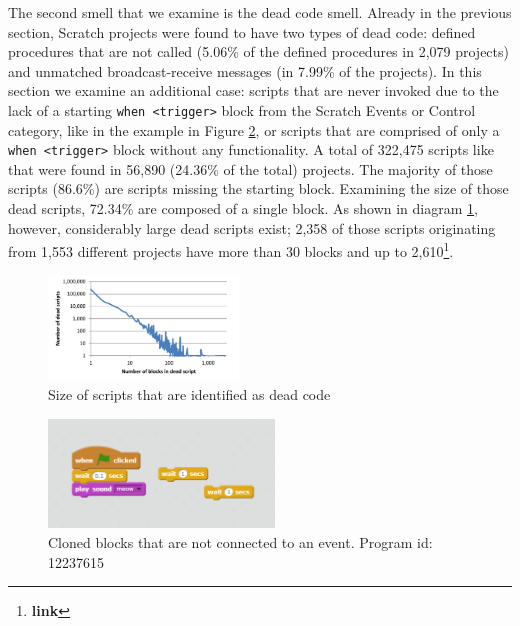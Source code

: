 \documentclass{sig-alternate}
\newcommand{\todo}[1]{\textbf{#1}}
\begin{document}
The second smell that we examine is the dead code smell. Already in the previous section, Scratch projects were found to have two types of dead code: defined procedures that are not called (5.06\% of the defined procedures in 2,079 projects) and unmatched broadcast-receive messages (in 7.99\% of the projects). In this section we examine an additional case: scripts that are never invoked due to the lack of a starting \texttt{when <trigger>} block from the Scratch Events or Control category, like in the example in Figure \ref{fig:Unconnected_clones}, or scripts that are comprised of only a \texttt{when <trigger>} block without any functionality. A total of 322,475 scripts like that were found in 56,890 (24.36\% of the total) projects. The majority of those scripts (86.6\%) are scripts missing the starting block. Examining the size of those dead scripts, 72.34\% are composed of a single block. As shown in diagram \ref{fig:deadcode}, however, considerably large dead scripts exist; 2,358 of those scripts originating from 1,553 different projects have more than 30 blocks and up to 2,610\footnote{\todo{link}}.

\begin{figure}
	\centering
	\includegraphics[width=0.45\textwidth]{fig/charts/12deadcode}
	\caption{Size of scripts that are identified as dead code}
	\label{fig:deadcode}
\end{figure}

\begin{figure}
	\begin{center}
		\includegraphics[width=6cm]{fig/Unconnected_clones.png}
		\caption{Cloned blocks that are not connected to an event. Program id: 12237615}
		\label{fig:Unconnected_clones}
	\end{center}
\end{figure} 
\end{document}
